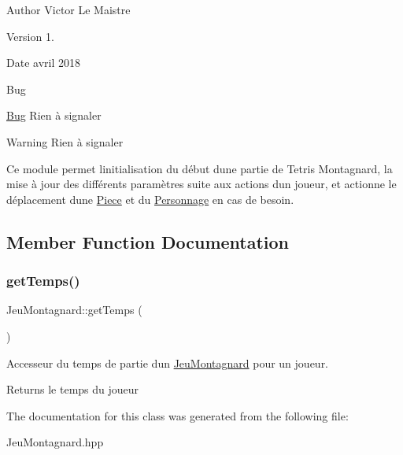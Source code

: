 \begin{DoxyAuthor}{Author}
Victor Le Maistre 
\end{DoxyAuthor}
\begin{DoxyVersion}{Version}
1. 
\end{DoxyVersion}
\begin{DoxyDate}{Date}
avril 2018 
\end{DoxyDate}
\begin{DoxyRefDesc}{Bug}
\item[\hyperlink{bug__bug000008}{Bug}]Rien à signaler \end{DoxyRefDesc}
\begin{DoxyWarning}{Warning}
Rien à signaler
\end{DoxyWarning}
Ce module permet l\textquotesingle{}initialisation du début d\textquotesingle{}une partie de Tetris Montagnard, la mise à jour des différents paramètres suite aux actions d\textquotesingle{}un joueur, et actionne le déplacement d\textquotesingle{}une \hyperlink{classPiece}{Piece} et du \hyperlink{classPersonnage}{Personnage} en cas de besoin. 

\subsection{Member Function Documentation}
\mbox{\label{classJeuMontagnard_aa4934bcc49ec59f1fd922ab6466f7a9b}} 
\subsubsection{\texorpdfstring{get\+Temps()}{getTemps()}}
{\footnotesize\ttfamily Jeu\+Montagnard\+::get\+Temps (\begin{DoxyParamCaption}{ }\end{DoxyParamCaption})}



Accesseur du temps de partie d\textquotesingle{}un \hyperlink{classJeuMontagnard}{Jeu\+Montagnard} pour un joueur. 

\begin{DoxyReturn}{Returns}
le temps du joueur 
\end{DoxyReturn}


The documentation for this class was generated from the following file\+:\begin{DoxyCompactItemize}
\item 
Jeu\+Montagnard.\+hpp\end{DoxyCompactItemize}
